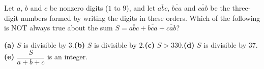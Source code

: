 Let $a$, $b$ and $c$ be nonzero digits ($1$ to $9$), and let $\overline{abc}$, $\overline{bca}$ and $\overline{cab}$ be the three-digit numbers formed by writing the digits in these orders. Which of the following is NOT always true about the sum $S=\overline{abc}+\overline{bca}+\overline{cab}$?

\textbf{(a)} $S$ is divisible by $3$.\quad \textbf{(b)} $S$ is divisible by $2$.\quad \textbf{(c)} $S>330$.\quad \textbf{(d)} $S$ is divisible by $37$.\quad \textbf{(e)} $\dfrac{S}{a+b+c}$ is an integer.
